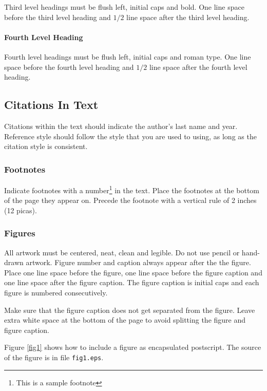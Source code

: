 \documentclass[a4paper]{article}
\begin{document}
Third level headings must be flush left, initial caps and bold.
One line space before the third level heading and $1/2$ line
space after the third level heading.

\paragraph{Fourth Level Heading}

Fourth level headings must be flush left, initial caps and roman type.
One line space before the fourth level heading and $1/2$ line
space after the fourth level heading.

\subsection{Citations In Text}

Citations within the text should indicate the author's last name and
year\cite{Knuth-vol3}. Reference style\cite{Comer-btree}
should follow the style that you are used to using, as long as the
citation style is consistent.

\subsubsection{Footnotes}

Indicate footnotes with a number\footnote{This is a sample footnote} in
the text. Place the footnotes at the bottom of the page they appear on.
Precede the footnote with a vertical rule of 2 inches (12 picas).

\subsubsection{Figures}

All artwork must be centered, neat, clean and legible. Do not use pencil
or hand-drawn artwork. Figure number and caption always appear after the
the figure. Place one line space before the figure, one line space
before the figure caption and one line space after the figure caption.
The figure caption is initial caps and each figure is numbered
consecutively.

Make sure that the figure caption does not get separated from the
figure. Leave extra white space at the bottom of the page to avoid
splitting the figure and figure caption.

Figure \ref{fig1} shows how to include a figure as encapsulated postscript.
The source of the figure is in file {\tt fig1.eps}.
\end{document}
